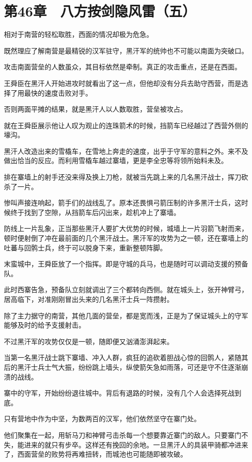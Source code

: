 \section{第46章　八方按剑隐风雷（五）}

相对于南营的轻松取胜，西面的情况却极为危急。

既然理应了解南营是最精锐的汉军驻守，黑汗军的统帅也不可能以南面为突破口。

攻击南面营垒的人数虽众，其目标依然是牵制。真正的攻击重点，还是在西面。

王舜臣在黑汗人开始进攻时就看出了这一点，但他却没有分兵去助守西营，而是选择了用最快的速度击败对手。

否则两面平摊的结果，就是黑汗人以人数取胜，营垒被攻占。

就在王舜臣展示他让人叹为观止的连珠箭术的时候，挡箭车已经越过了西营外侧的壕沟。

黑汗人改造出来的雪橇车，在雪地上奔走的速度，出乎于守军的意料之外。来不及做出恰当的反应。而利用雪橇车越过寨墙，更是李全忠等将领所始料未及。

排在寨墙上的射手还没来得及换上刀枪，就被当先跳上来的几名黑汗战士，挥刀砍杀了一片。

惨叫声接连响起，箭手们的战线乱了。原本还畏惧弓箭压制的许多黑汗士兵，这时候终于找到了空隙，从挡箭车后闪出来，趁机冲上了寨墙。

防线上一片乱象，正当那些黑汗人要扩大优势的时候，城墙上一片羽箭飞射而来，顿时便射倒了冲在最前面的几个黑汗战士。黑汗军的攻势为之一顿，还在寨墙上的吐蕃与回鹘士兵，终于可以脱身下来，重新整顿阵脚。

末蛮城中，王舜臣放了一个指挥。即是守城的兵马，也是随时可以调动支援的预备队。

此时西寨告急，预备队立刻就调出了三个都转向西侧。就在城头上，张开神臂弓，居高临下，对准刚刚冒出头来的几名黑汗士兵一阵攒射。

除了主力据守的南营，其他几面的营垒，都是宽而浅，正是为了保证城头上的守军能够及时的给予支援射击。

不过黑汗军的攻势仅仅是一顿，随即便又汹涌澎湃起来。

当第一名黑汗战士跳下寨墙、冲入人群，疯狂的追砍着胆战心惊的回鹘人，紧随其后的黑汗士兵士气大振，纷纷跳上墙头，纵使箭矢急如雨落，可还是守不住逐渐崩溃的战线。

寨中的守军，开始纷纷退往城中。背后有退路的时候，没有几个人会选择死战到底。

只有营地中作为中坚，为数两百的汉军，他们依然坚守在寨门处。

他们聚集在一起，用斩马刀和神臂弓击杀每一个想要靠近寨门的敌人。只要寨门不失，能进来的就只有步卒。这样还有挽回的余地。一旦黑汗人的具装甲骑都冲进来了，西面营垒的败势将再难扭转，而城池也可能随即被攻破。


